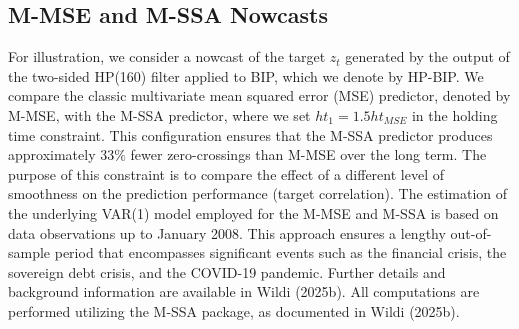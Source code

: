 \documentclass[a4paper]{article}
\begin{document}
\subsection{M-MSE and M-SSA Nowcasts}

For illustration, we consider a nowcast of the target $z_t$ generated by the output of the two-sided HP(160) filter applied to BIP, which we denote by HP-BIP. We compare the classic multivariate mean squared error (MSE) predictor, denoted by M-MSE, with the M-SSA predictor, where we set $ht_1=1.5ht_{MSE}$ in the holding time constraint. This configuration ensures that the M-SSA predictor produces approximately 33$\%$ fewer zero-crossings than M-MSE over the long term. The purpose of this constraint is to compare the effect of a different level of smoothness on the prediction performance (target correlation). The estimation of the underlying VAR(1) model employed for the M-MSE and M-SSA is based on data observations up to January 2008. This approach ensures a lengthy out-of-sample period that encompasses significant events such as the financial crisis, the sovereign debt crisis, and the COVID-19 pandemic. Further details and background information are available in Wildi (2025b). All computations are performed utilizing the M-SSA package, as documented in Wildi (2025b).\\
\end{document}

